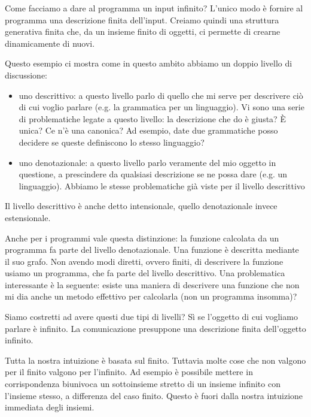 Come facciamo a dare al programma un input infinito? L'unico modo è fornire al programma una
descrizione finita dell'input. Creiamo quindi una struttura generativa finita che, da un insieme
finito di oggetti, ci permette di crearne dinamicamente di nuovi.

Questo esempio ci mostra come in questo ambito abbiamo un doppio livello di discussione:
\begin{itemize}

    \item uno descrittivo: a questo livello parlo di quello che mi serve per descrivere ciò di cui
    voglio parlare (e.g. la grammatica per un linguaggio). Vi sono una serie di problematiche legate
    a questo livello: la descrizione che do è giusta? È unica? Ce n'è una canonica? Ad esempio,
    date due grammatiche posso decidere se queste definiscono lo stesso linguaggio?

    \item uno denotazionale: a questo livello parlo veramente del mio oggetto in questione, a
    prescindere da qualsiasi descrizione se ne possa dare (e.g. un linguaggio). Abbiamo le stesse
    problematiche già viste per il livello descrittivo 

\end{itemize}

Il livello descrittivo è anche detto intensionale, quello denotazionale invece estensionale.

Anche per i programmi vale questa distinzione: la funzione calcolata da un programma fa parte del
livello denotazionale. Una funzione è descritta mediante il suo grafo. Non avendo modi diretti,
ovvero finiti, di descrivere la funzione usiamo un programma, che fa parte del livello descrittivo.
Una problematica interessante è la seguente: esiste una maniera di descrivere una funzione che non
mi dia anche un metodo effettivo per calcolarla (non un programma insomma)? 

Siamo costretti ad avere questi due tipi di livelli? Sì se l'oggetto di cui vogliamo parlare è
infinito. La comunicazione presuppone una descrizione finita dell'oggetto infinito.

Tutta la nostra intuizione è basata sul finito. Tuttavia molte cose che non valgono per il finito
valgono per l'infinito. Ad esempio è possibile mettere in corrispondenza biunivoca un sottoinsieme
stretto di un insieme infinito con l'insieme stesso, a differenza del caso finito. Questo è fuori
dalla nostra intuizione immediata degli insiemi.

